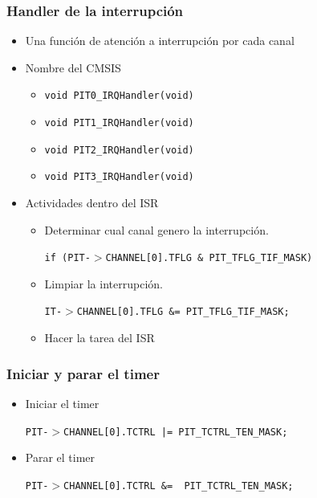 \documentclass[10.5pt,scale=1.0,t,aspectratio=169,hyperref={pdfpagelabels=false}]{beamer}
\begin{document}
\begin{frame}
	\frametitle{Handler de la interrupción}
	{\small
		\begin{itemize}
			\setlength\itemsep{0em}
			\item Una función de atención a interrupción por cada canal
			\item Nombre del CMSIS
			\begin{itemize}
				\item \texttt{void PIT0\_IRQHandler(void)}
				\item \texttt{void PIT1\_IRQHandler(void)}
				\item \texttt{void PIT2\_IRQHandler(void)}
				\item \texttt{void PIT3\_IRQHandler(void)}
			\end{itemize}
			\item Actividades dentro del ISR
			\begin{itemize}
				\item Determinar cual canal genero la interrupción. 
				
				\texttt{if (PIT-$>$CHANNEL[0].TFLG \& PIT\_TFLG\_TIF\_MASK)}
				\item Limpiar la interrupción. 
				
				\texttt{IT-$>$CHANNEL[0].TFLG \&= PIT\_TFLG\_TIF\_MASK;}
				\item Hacer la tarea del ISR
			\end{itemize}
		\end{itemize}
	}
\end{frame}
\begin{frame}
	\frametitle{Iniciar y parar el timer}
	{\small
		\begin{itemize}
			\setlength\itemsep{0em}
			\item Iniciar el timer
			
			\texttt{PIT-$>$CHANNEL[0].TCTRL |= PIT\_TCTRL\_TEN\_MASK;}
			
			\item Parar el timer
			
			\texttt{PIT-$>$CHANNEL[0].TCTRL \&= ~PIT\_TCTRL\_TEN\_MASK;}
		\end{itemize}
	}
\end{frame}
\end{document}
